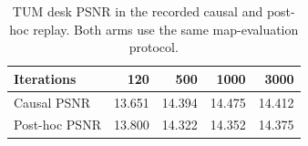\begin{table}[t]
\centering\small
\begin{tabular}{@{}lrrrr@{}}
\toprule
Iterations & 120 & 500 & 1000 & 3000\\
\midrule
Causal PSNR & 13.651 & 14.394 & 14.475 & 14.412\\
Post-hoc PSNR & 13.800 & 14.322 & 14.352 & 14.375\\
\bottomrule
\end{tabular}
\caption[Refinement iteration-budget control]{TUM desk PSNR in the recorded
causal and post-hoc replay. Both arms use the same map-evaluation protocol.}
\label{tab:budget}
\end{table}
